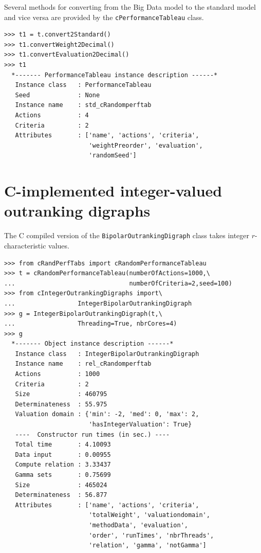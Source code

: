 Several methods for converting from the Big Data model to the standard model and vice versa are provided by the \texttt{cPerformanceTableau} class.
\begin{lstlisting}   
>>> t1 = t.convert2Standard()
>>> t1.convertWeight2Decimal()
>>> t1.convertEvaluation2Decimal()
>>> t1
  *------- PerformanceTableau instance description ------*
   Instance class   : PerformanceTableau
   Seed             : None
   Instance name    : std_cRandomperftab
   Actions          : 4
   Criteria         : 2
   Attributes       : ['name', 'actions', 'criteria',
                       'weightPreorder', 'evaluation',
                       'randomSeed']
\end{lstlisting}

\section{C-implemented integer-valued outranking digraphs}
\label{sec:11.3}

The C compiled version of the \texttt{BipolarOutrankingDigraph} class takes integer $r$-characteristic values.
\begin{lstlisting}[caption={Constructing big bipolar-valued outranking digraphs},label=list:11.2]
>>> from cRandPerfTabs import cRandomPerformanceTableau
>>> t = cRandomPerformanceTableau(numberOfActions=1000,\
...                               numberOfCriteria=2,seed=100)
>>> from cIntegerOutrankingDigraphs import\
...                 IntegerBipolarOutrankingDigraph
>>> g = IntegerBipolarOutrankingDigraph(t,\
...                 Threading=True, nbrCores=4)
>>> g
  *------- Object instance description ------*
   Instance class   : IntegerBipolarOutrankingDigraph
   Instance name    : rel_cRandomperftab
   Actions          : 1000
   Criteria         : 2
   Size             : 460795
   Determinateness  : 55.975
   Valuation domain : {'min': -2, 'med': 0, 'max': 2,
                       'hasIntegerValuation': True}
   ----  Constructor run times (in sec.) ----
   Total time       : 4.10093
   Data input       : 0.00955
   Compute relation : 3.33437
   Gamma sets       : 0.75699
   Size             : 465024
   Determinateness  : 56.877
   Attributes       : ['name', 'actions', 'criteria',
                       'totalWeight', 'valuationdomain',
                       'methodData', 'evaluation',
                       'order', 'runTimes', 'nbrThreads',
                       'relation', 'gamma', 'notGamma']
\end{lstlisting}

